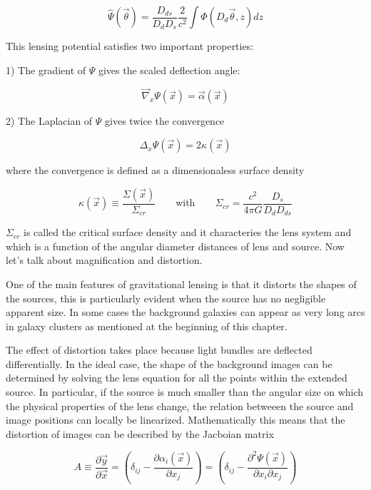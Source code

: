 \begin{equation}
\hat{\Psi}(\vec{\theta})=\frac{D_{ds}}{D_{d}D_{s}}\frac{2}{c^{2}}\int\Phi(D_{d}\vec{\theta},z)dz
\end{equation}

This lensing potential satisfies two important properties:

1) The gradient of $\Psi$ gives the scaled deflection angle:

\begin{equation}
\vec{\nabla}_{x}\Psi(\vec{x})=\vec{\alpha}(\vec{x})
\end{equation}

2) The Laplacian of $\Psi$ gives twice the convergence

\begin{equation}
\Delta_{x}\Psi(\vec{x})=2\kappa(\vec{x})
\end{equation}

where the convergence is defined as a dimensionaless surface density

\begin{equation}
\kappa(\vec{x})\equiv \frac{\Sigma(\vec{x})}{\Sigma_{cr}}\qquad \text{with} \qquad \Sigma_{cr}=\frac{c^{2}}{4\pi G}\frac{D_s}{D_d D_{ds}}
\end{equation}

$\Sigma_{cr}$ is called the critical surface density and it characteries the lens system and which is a function of the angular diameter distances of lens and source. Now let's talk about magnification and distortion.

One of the main features of gravitational lensing is that it distorts the shapes of the sources, this is particularly evident when the source has no negligible apparent size. In some cases the background galaxies can appear as very long arcs in galaxy clusters as mentioned at the beginning of this chapter. 

The effect of distortion takes place because light bundles are deflected differentially. In the ideal case, the shape of the background images can be determined by solving the lens equation for all the points within the extended source. In particular, if the source is much smaller than the angular size on which the physical properties of the lens change, the relation betweeen the source and image positions can locally be linearized. Mathematically this means that the distortion of images can be described by the Jacboian matrix

\begin{equation}
A\equiv\frac{\partial\vec{y}}{\partial\vec{x}}=\left(\delta_{ij}-\frac{\partial\alpha_{i}(\vec{x})}{\partial x_{j}}\right)=\left(\delta_{ij}-\frac{\partial^{2}\Psi(\vec{x})}{\partial x_{i}\partial x_{j}}\right)
\end{equation}

